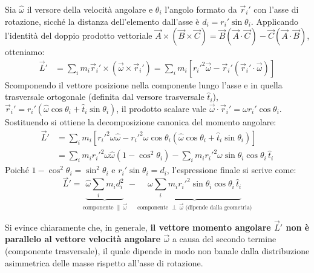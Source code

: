 Sia $\hat{\omega}$ il versore della velocità angolare e $\theta_i$ l'angolo formato da $\vec{r}_i'$ con l'asse di rotazione, sicché la distanza dell'elemento dall'asse è $d_i = r_i' \sin\theta_i$. Applicando l'identità del doppio prodotto vettoriale $\vec{A} \times (\vec{B} \times \vec{C}) = \vec{B}(\vec{A} \cdot \vec{C}) - \vec{C}(\vec{A} \cdot \vec{B})$, otteniamo:
\begin{align*}
    \vec{L}' &= \sum_i m_i \vec{r}_i' \times (\vec{\omega} \times \vec{r}_i') = \sum_i m_i \left[ {r_i'}^2 \vec{\omega} - \vec{r}_i'(\vec{r}_i' \cdot \vec{\omega}) \right]
\end{align*}
Scomponendo il vettore posizione nella componente lungo l'asse e in quella trasversale ortogonale (definita dal versore trasversale $\hat{t}_i$), $\vec{r}_i' = r_i'(\hat{\omega}\cos\theta_i + \hat{t}_i \sin\theta_i)$, il prodotto scalare vale $\vec{\omega} \cdot \vec{r}_i' = \omega r_i' \cos\theta_i$. Sostituendo si ottiene la decomposizione canonica del momento angolare:
\begin{align*}
    \vec{L}' &= \sum_i m_i \left[ {r_i'}^2 \omega \hat{\omega} - {r_i'}^2 \omega \cos\theta_i (\hat{\omega}\cos\theta_i + \hat{t}_i \sin\theta_i) \right] \\
    &= \sum_i m_i {r_i'}^2 \omega \hat{\omega}(1 - \cos^2\theta_i) - \sum_i m_i {r_i'}^2 \omega \sin\theta_i \cos\theta_i \, \hat{t}_i
\end{align*}
Poiché $1 - \cos^2\theta_i = \sin^2\theta_i$ e $r_i' \sin\theta_i = d_i$, l'espressione finale si scrive come:
\begin{equation}
    \vec{L}' = \underbrace{\hat{\omega} \sum_i m_i d_i^2}_{\text{componente } \parallel \, \vec{\omega}} - \underbrace{\omega \sum_i m_i {r_i'}^2 \sin\theta_i \cos\theta_i \, \hat{t}_i}_{\text{componente } \perp \, \vec{\omega} \text{ (dipende dalla geometria)}}
\end{equation}

Si evince chiaramente che, in generale, \textbf{il vettore momento angolare $\vec{L}'$ non è parallelo al vettore velocità angolare $\vec{\omega}$} a causa del secondo termine (componente trasversale), il quale dipende in modo non banale dalla distribuzione asimmetrica delle masse rispetto all'asse di rotazione.

